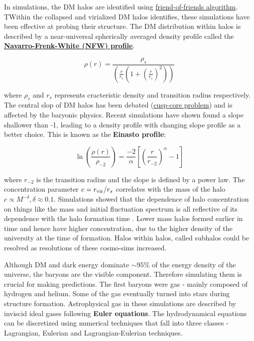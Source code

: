 \documentclass{book}
\begin{document}
In simulations, the DM halos are identified using \href{https://swift.strw.leidenuniv.nl/docs/FriendsOfFriends/algorithm_description.html}{friend-of-friends algorithm}. TWithin the collapsed and virialized DM halos identifies, these simulations have been effective at probing their structure. The DM distribution within halos is described by a near-universal spherically averaged density profile called the \textbf{\href{http://www.astro.yale.edu/vdbosch/jerusalem_lecture3.pdf}{Navarro-Frenk-White (NFW) profile}}. 

\begin{equation}
    \label{eq:NFW}
    \rho(r) = \frac{\rho_s}{\left(\frac{r}{r_s} \left(1 + \left(\frac{r}{r_s} \right)^2 \right)\right)}
\end{equation}

where $\rho_s$ and $r_s$ represents cracteristic density and transition radius respectively. The central slop of DM halos has been debated (\href{https://arxiv.org/pdf/0910.3538}{cusp-core problem}) and is affected by the baryonic physics. Recent simulations have shown found a slope shallower than -1, leading to a density profile with changing slope profile as a better choice. This is known as the \textbf{Einasto profile}:

\begin{equation}
    \label{eq: Einasto}
    \ln{\left(\frac{\rho(r)}{\rho_{-2}}\right)} = \frac{-2}{\alpha} \left[ \left( \frac{r}{r_{-2}} \right)^{\alpha} -1 \right]
\end{equation}

where $r_{-2}$ is the transition radius and the slope is defined by a power law. The concentration parameter $ c = r_{\rm vir}/r_s$ correlates with the mass of the halo $c \propto M^{- \delta}, \delta \approx 0.1$. Simulations showed that the dependence of halo concentration on things like the mass and initial fluctuation spectrum is all reflective of its dependence with the halo formation time \citep{Navarro_1997}. Lower mass halos formed earlier in time and hence have higher concentration, due to the higher density of the university at the time of formation. Halos within halos, called subhalos could be resolved as resolutions of these cosmo-sims increased. 



Although DM and dark energy dominate $\sim 95 \%$ of the energy density of the universe, the baryons are the visible component. Therefore simulating them is crucial for making predictions. The first baryons were gas - mainly composed of hydrogen and helium. Some of the gas eventually turned into stars during structure formation. Astrophysical gas in these simulations are described by inviscid ideal gases following \textbf{Euler equations}. The hydrodynamical equations can be discretized using numerical techniques that fall into three classes - Lagrangian, Eulerian and Lagrangian-Eulerian techniques. 
\end{document}
